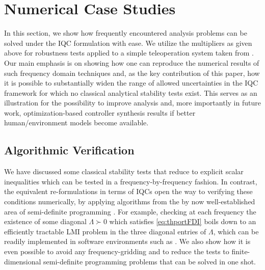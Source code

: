 \section{Numerical Case Studies}\label{sec:num}
In this section, we show how frequently encountered analysis problems can be solved under the IQC formulation with ease.
We utilize the multipliers as given above for  robustness tests applied to a simple teleoperation system taken from \cite{willaert,willaertIJRR10}.
Our main emphasis is on showing how one can reproduce the numerical results of such frequency domain techniques and, as the key contribution of this paper, how it is possible to substantially widen the range of allowed uncertainties in the IQC framework for which no classical analytical stability tests exist. This serves as an illustration for the possibility to improve analysis and, more importantly in future work, optimization-based controller synthesis results if better human/environment models become available.

\subsection{Algorithmic Verification}\label{sec:algver}

We have discussed some classical stability tests that reduce to explicit scalar inequalities which can be tested in a frequency-by-frequency fashion. In contrast, the equivalent re-formulations in terms of IQCs open the way to verifying these conditions numerically, by applying algorithms from the by now well-established area of semi-definite programming \cite{lmiboydbook}. For example, checking at each frequency the existence of some diagonal $\Lambda\succ 0$ which satisfies \eqref{eq:thportFDI} boils down to an efficiently tractable LMI problem in the three diagonal entries of $\Lambda$, which can be readily implemented in software environments such as \cite{yalmip}. We also show how it is even possible to avoid any frequency-gridding and to reduce the tests to finite-dimensional semi-definite programming problems that can be solved in one shot.

